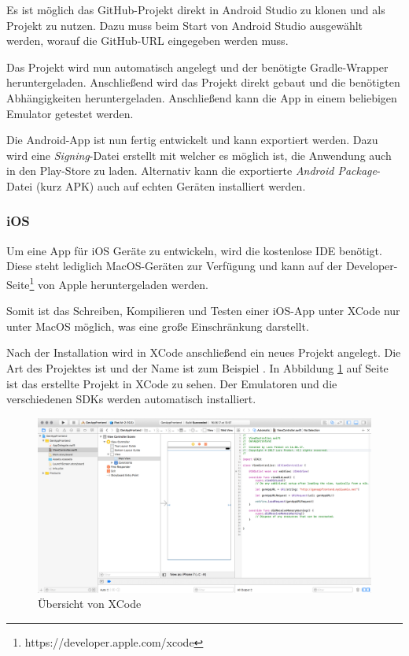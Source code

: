 Es ist möglich das GitHub-Projekt direkt in Android Studio zu klonen und als Projekt zu nutzen. Dazu muss beim Start von
Android Studio  ausgewählt werden, worauf die GitHub-URL eingegeben werden
muss.

Das Projekt wird nun automatisch angelegt und der benötigte Gradle-Wrapper heruntergeladen. Anschließend wird das Projekt
direkt gebaut und die benötigten Abhängigkeiten heruntergeladen. Anschließend kann die App in einem beliebigen Emulator
getestet werden.

Die Android-App ist nun fertig entwickelt und kann exportiert werden. Dazu wird eine \textit{Signing}-Datei erstellt
mit welcher es möglich ist, die Anwendung auch in den Play-Store zu laden. Alternativ kann die exportierte
\textit{Android Package}-Datei (kurz APK) auch auf echten Geräten installiert werden.

\clearpage
\newpage

\subsubsection{iOS}
Um eine App für iOS Geräte zu entwickeln, wird die kostenlose IDE  benötigt. Diese steht lediglich MacOS-Geräten
zur Verfügung und kann auf der Developer-Seite\footnote{https://developer.apple.com/xcode} von Apple heruntergeladen werden.

Somit ist das Schreiben, Kompilieren und Testen einer iOS-App unter XCode nur unter MacOS möglich, was eine große
Einschränkung darstellt.

Nach der Installation wird in XCode anschließend ein neues Projekt angelegt. Die Art des Projektes ist 
und der Name ist zum Beispiel . In Abbildung \ref{fig:xcode_overview} auf Seite \pageref{fig:xcode_overview}
ist das erstellte Projekt in XCode zu sehen. Der Emulatoren und die verschiedenen SDKs werden automatisch installiert.

\begin{figure}[h]
 \centering
   \includegraphics[scale=0.26]{images/kapitel_4/xcode_overview.png}
 \caption{Übersicht von XCode}
 \label{fig:xcode_overview}
\end{figure}

